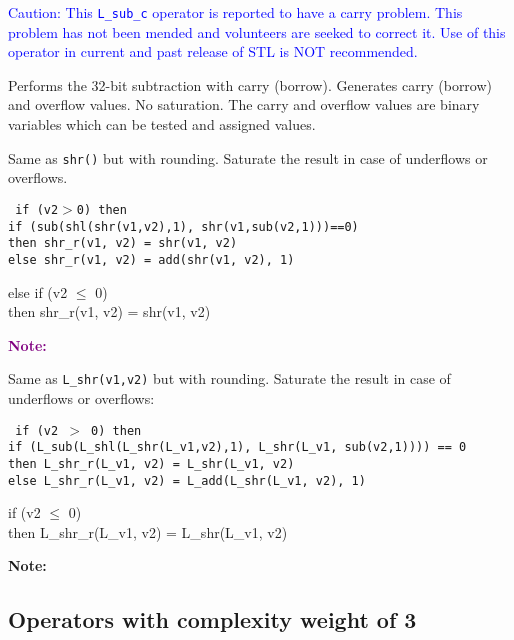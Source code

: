 \textcolor{blue}{
%
  Caution: This {\tt L\_sub\_c} operator is reported to have a carry
  problem. This problem has not been mended and volunteers are seeked
  to correct it. Use of this operator in current and past release of
  STL is NOT recommended.
%
}

Performs the 32-bit subtraction with carry (borrow). Generates
carry (borrow) and overflow values. No saturation. The carry and
overflow values are binary variables which can be tested and
assigned values.


Same as {\tt shr()} but with rounding. Saturate the result in case
of underflows or overflows.

{\tt
{} if (v2$>$0) then\\
    if (sub(shl(shr(v1,v2),1), shr(v1,sub(v2,1)))==0) \\
    then shr\_r(v1, v2) = shr(v1, v2)\\
    else shr\_r(v1, v2) = add(shr(v1, v2), 1)

 else if (v2 $\leq$ 0) \\
    then shr\_r(v1, v2) = shr(v1, v2)}

\textcolor{purple} {
\textbf{Note:} \hfill {}
}



Same as {\tt L\_shr(v1,v2)} but with rounding. Saturate the result
in case of underflows or overflows:

{\tt
{} if (v2 $>$ 0) then\\
   if (L\_sub(L\_shl(L\_shr(L\_v1,v2),1), L\_shr(L\_v1, sub(v2,1)))) == 0 \\
   then L\_shr\_r(L\_v1, v2) = L\_shr(L\_v1, v2)\\
   else L\_shr\_r(L\_v1, v2) = L\_add(L\_shr(L\_v1, v2), 1)

 if (v2 $\leq$ 0) \\
   then L\_shr\_r(L\_v1, v2) = L\_shr(L\_v1, v2)}

\textbf{Note:} \hfill {}


\subsection{Operators with complexity weight of 3}
